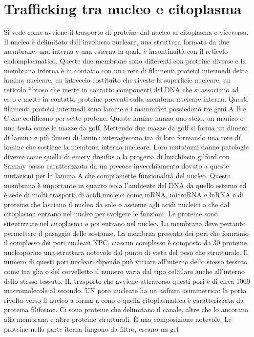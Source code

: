 \section{Trafficking tra nucleo e citoplasma}
Si vede come avviene il trasporto di proteine dal nucleo al citoplasma e viceversa. Il nucleo \`e delimitato dall'involucro nucleare, una struttura formata da due membrane, una interna
e una esterna la quale \`e incontinuit\`a con il reticolo endomplasmatico. Queste due membrane sono differenti con proteine diverse e la membrana interna \`e in contatto con una rete
di filamenti proteici intermedi detta lamina nucleare, un intreccio costituito che riveste la superficie nucleare,  un reticolo fibroso che mette in contatto componenti del DNA che 
si associano ad esso e mette in contatto proteine presenti sulla membrna nucleare interna. Questi filamenti proteici intermedi sono lamine e i mammiferi possiedono tre geni A B e C che
codificano per sette protene. Queste lamine hanno uno stelo, un manico e una testa come le mazze da golf. Mettendo due mazze da golf si forma un dimero di lamina e pi\`u dimeri di lamina
interagiscono tra di loro formando una rete di lamine che sostiene la membrna interna nucleare. Loro mutaiozni danno patologie diverse come quella di emery dreufus o la progeria 
di hutchinsin gilford con Sammy basso caratterizzata da un precoce invecchiamento dovuto a queste mutazioni per la lamina A che compromette funzionalit\`a del nucleo. Questa membrana
\`e importante in quanto isola l'ambiente del DNA da quello esterno ed \`e sede di molti trasporti di acidi nucleici come mRNA, microRNA e lnRNA e di proteine che lasciano il nucleo
da sole o assieme agli acidi nucleici o che dal citoplasma entrano nel nucleo per svolgere le funzioni. Le proteine sono sitentizzate nel citoplasma e poi entrano nel nucleo. La membrana
deve pertanto permettere il pasaggio delle sostanze. La membrna presenta dei pori che fomranio il complesso dei pori nucleari NPC, ciascun complesso \`e composto da 30 proteine 
nucleoporine una struttura notevole dal punto di vista del peso che strutturale. Il numero di questi pori nucleari dipende pu\`o variare all'interno dello stesso tessuto come tra glia
o del cervelletto il numero varia dal tipo cellulare anche all'interno dello stesso tessuto. IL trasporto che avviene attraverso questi pori \`e di circa 1000 macromolecole al secondo. 
UN poro nucleare ha un aofmra asimmetrica: la porta rivolta verso il nucleo a forma a cono e quella citoplasmatica \`e caratterizzata da proteina filiforme. Ci sono proteine che 
delimitano il canale, altre che lo ancorano alla membrana e altre proteine strutturali. \`E una composizione notevole. Le proteine nella parte iterna fungono da filtro, creano un gel
